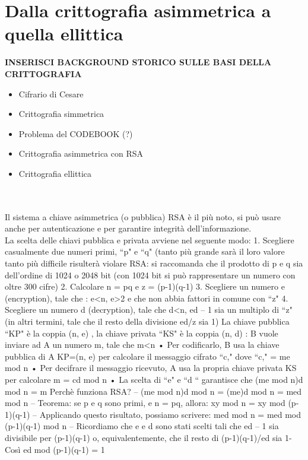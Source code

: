\documentclass[a4paper,12pt]{tesiinfo}
\begin{document}
\chapter{Dalla crittografia asimmetrica a quella ellittica}
\textbf{INSERISCI BACKGROUND STORICO SULLE BASI DELLA CRITTOGRAFIA }
\begin{itemize}
    \item Cifrario di Cesare
    \item Crittografia simmetrica
    \item Problema del CODEBOOK (?)
    \item Crittografia asimmetrica con RSA
    \item Crittografia ellittica
\end{itemize}
\noindent\makebox[\linewidth]{\rule{\paperwidth}{0.4pt}}
\\
\\
Il sistema a chiave asimmetrica (o pubblica) RSA \`e il pi\`u noto, si pu\`o usare anche per autenticazione e per garantire integrit\`a dell'informazione.
\\
La scelta delle chiavi pubblica e privata avviene nel seguente modo:
1. Scegliere casualmente due numeri primi, ``p" e ``q"
(tanto pi\`u grande sar\`a il loro valore tanto pi\`u difficile
risulter\`a violare RSA: si raccomanda che il prodotto di p
e q sia dell'ordine di 1024 o 2048 bit (con 1024 bit si
pu\`o rappresentare un numero con oltre 300 cifre)
2. Calcolare n = pq e z = (p-1)(q-1)
3. Scegliere un numero e (encryption), tale che : e<n, e>2 e che non abbia fattori in comune con ``z"
4. Scegliere un numero d (decryption), tale che d<n, ed – 1 sia un multiplo di ``z" (in altri termini, tale che il resto della divisione ed/z sia 1)
La chiave pubblica  ``KP" \`e la coppia (n, e) , la chiave privata ``KS" \`e la coppia (n, d) : B vuole inviare ad A un numero m, tale che m<n
• Per codificarlo, B usa la chiave pubblica di A KP=(n, e) per calcolare il messaggio cifrato ``c," dove ``c,"  = me mod n
• Per decifrare il messaggio ricevuto, A usa la propria chiave privata KS per calcolare m = cd mod n
• La scelta di ``e" e ``d `` garantisce che (me mod n)d mod n = m 
Perch\`e funziona RSA? – (me mod n)d mod n = (me)d mod n = med mod n
– Teorema: se p e q sono primi, e n = pq, allora: xy mod n = xy mod (p-1)(q-1)
– Applicando questo risultato, possiamo scrivere: med mod n = med mod (p-1)(q-1) mod n
– Ricordiamo che e e d sono stati scelti tali che ed – 1 sia divisibile per (p-1)(q-1) o, equivalentemente, che il resto di (p-1)(q-1)/ed sia 1- Cos\`i ed mod (p-1)(q-1) = 1
\end{document}
